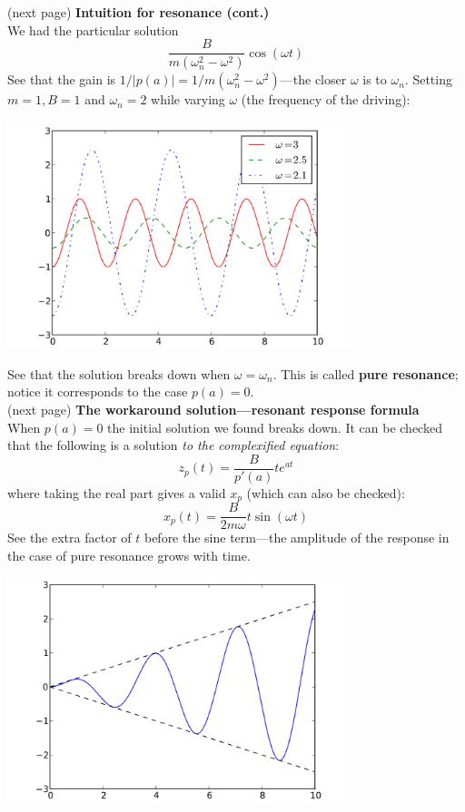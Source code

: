 \documentclass{report}
\begin{document}
(next page)
\newpage
\noindent\textbf{Intuition for resonance (cont.)}\\
We had the particular solution
\begin{equation*}
\frac{B}{m(\omega_n^2-\omega^2)}\cos(\omega t)
\end{equation*}
See that the gain is $1/|p(a)|=1/m(\omega_n^2-\omega^2)$---the closer $\omega$ is to $\omega_n$. 
Setting $m=1,B=1$ and $\omega_n=2$ while varying $\omega$ (the frequency of the driving):
\begin{center}
\includegraphics[width=10cm]{30}\\
\end{center}
See that the solution breaks down when $\omega=\omega_n$. This is called \textbf{pure resonance}; notice it corresponds to the case $p(a)=0$.\\
(next page)
\newpage
\noindent\textbf{The workaround solution---resonant response formula}\\
When $p(a)=0$ the initial solution we found breaks down. It can be checked that the following is a solution 
\textit{to the complexified equation}:
\begin{equation*}
z_p(t)=\frac{B}{p'(a)}te^{at}
\end{equation*}
where taking the real part gives a valid $x_p$ (which can also be checked):
\begin{equation*}
x_p(t)=\frac{B}{2m\omega}t\sin(\omega t)
\end{equation*}
See the extra factor of $t$ before the sine term---the amplitude of the response in the case of pure resonance
grows with time. 
\begin{center}
\includegraphics[width=10cm]{31}\\
\end{center}
\end{document}
